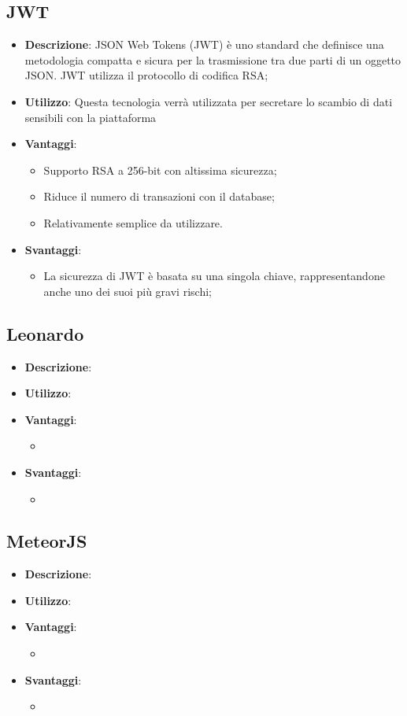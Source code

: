 \subsection{JWT}
\begin{itemize}
	\item \textbf{Descrizione}: JSON Web Tokens (JWT) è uno standard che definisce una metodologia compatta e sicura per la trasmissione tra due parti di un oggetto JSON. JWT utilizza il protocollo di codifica RSA;
	\item \textbf{Utilizzo}: Questa tecnologia verrà utilizzata per secretare lo scambio di dati sensibili con la piattaforma
	\item \textbf{Vantaggi}:
	\begin{itemize}
		\item Supporto RSA a 256-bit con altissima sicurezza;
		\item Riduce il numero di transazioni con il database;
		\item Relativamente semplice da utilizzare.
	\end{itemize}
	\item \textbf{Svantaggi}:
	\begin{itemize}
		\item La sicurezza di JWT è basata su una singola chiave, rappresentandone anche uno dei suoi più gravi rischi;
	\end{itemize}
\end{itemize}

\subsection{Leonardo}
\begin{itemize}
	\item \textbf{Descrizione}:
	\item \textbf{Utilizzo}:
	\item \textbf{Vantaggi}:
	\begin{itemize}
		\item 
	\end{itemize}
	\item \textbf{Svantaggi}:
	\begin{itemize}
		\item 
	\end{itemize}
\end{itemize}

\subsection{MeteorJS}
\begin{itemize}
	\item \textbf{Descrizione}:
	\item \textbf{Utilizzo}:
	\item \textbf{Vantaggi}:
	\begin{itemize}
		\item 
	\end{itemize}
	\item \textbf{Svantaggi}:
	\begin{itemize}
		\item 
	\end{itemize}
\end{itemize}

